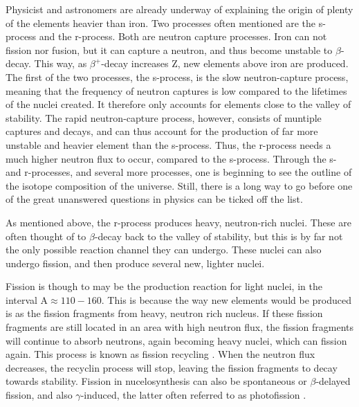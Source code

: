 \documentclass[]{article}
\begin{document}
\par
\vspace{3mm}

 \noindent Physicist and astronomers are already underway of explaining the origin of plenty of the elements heavier than iron. Two processes often mentioned are the s-process and the r-process. Both are neutron capture processes. Iron can not fission nor fusion, but it can capture a neutron, and thus become unstable to $\beta$-decay. This way, as $\beta^{+}$-decay increases Z, new elements above iron are produced. The first of the two processes, the s-process, is the slow neutron-capture process, meaning that the frequency of neutron captures is low compared to the lifetimes of the nuclei created. It therefore only accounts for elements close to the valley of stability. The rapid neutron-capture process, however, consists of muntiple captures and decays, and can thus account for the production of far more unstable and heavier element than the s-process. Thus, the r-process needs a much higher neutron flux to occur, compared to the s-process. Through the s- and r-processes, and several more processes, one is beginning to see the outline of the isotope composition of the universe. Still, there is a long way to go before one of the great unanswered questions in physics can be ticked off the list.

\par 
\vspace{3mm}

 \noindent As mentioned above, the r-process produces heavy, neutron-rich nuclei. These are often thought of to $\beta$-decay back to the valley of stability, but this is by far not the only possible reaction channel they can undergo. These nuclei can also undergo fission, and then produce several new, lighter nuclei.

\par 
\vspace{3mm}
 \noindent Fission is though to may be the production reaction for light nuclei, in the interval A$\approx 110 - 160$. This is because the way new elements would be produced is as the fission fragments from heavy, neutron rich nucleus. If these fission fragments are still located in an area with high neutron flux, the fission fragments will continue to absorb neutrons, again becoming heavy nuclei, which can fission again. This process is known as fission recycling \cite{Goriely2017}. When the neutron flux decreases, the recyclin process will stop, leaving the fission fragments to decay towards stability. Fission in nucelosynthesis can also be spontaneous or $\beta$-delayed fission, and also $\gamma$-induced, the latter often referred to as photofission \cite{Goriely2017}. 
\end{document}
